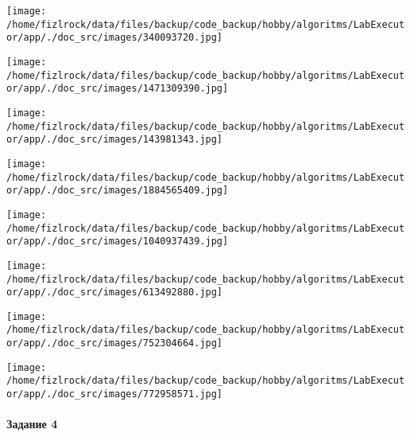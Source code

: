 \documentclass[a4paper, 12pt]{article}
\begin{document}
\texttt{[image: /home/fizlrock/data/files/backup/code\_backup/hobby/algoritms/LabExecutor/app/./doc\_src/images/340093720.jpg]}

\texttt{[image: /home/fizlrock/data/files/backup/code\_backup/hobby/algoritms/LabExecutor/app/./doc\_src/images/1471309390.jpg]}

\texttt{[image: /home/fizlrock/data/files/backup/code\_backup/hobby/algoritms/LabExecutor/app/./doc\_src/images/143981343.jpg]}

\texttt{[image: /home/fizlrock/data/files/backup/code\_backup/hobby/algoritms/LabExecutor/app/./doc\_src/images/1884565409.jpg]}

\texttt{[image: /home/fizlrock/data/files/backup/code\_backup/hobby/algoritms/LabExecutor/app/./doc\_src/images/1040937439.jpg]}

\texttt{[image: /home/fizlrock/data/files/backup/code\_backup/hobby/algoritms/LabExecutor/app/./doc\_src/images/613492880.jpg]}

\texttt{[image: /home/fizlrock/data/files/backup/code\_backup/hobby/algoritms/LabExecutor/app/./doc\_src/images/752304664.jpg]}

\texttt{[image: /home/fizlrock/data/files/backup/code\_backup/hobby/algoritms/LabExecutor/app/./doc\_src/images/772958571.jpg]}
\pagebreak
\paragraph{Задание 4}
\end{document}
